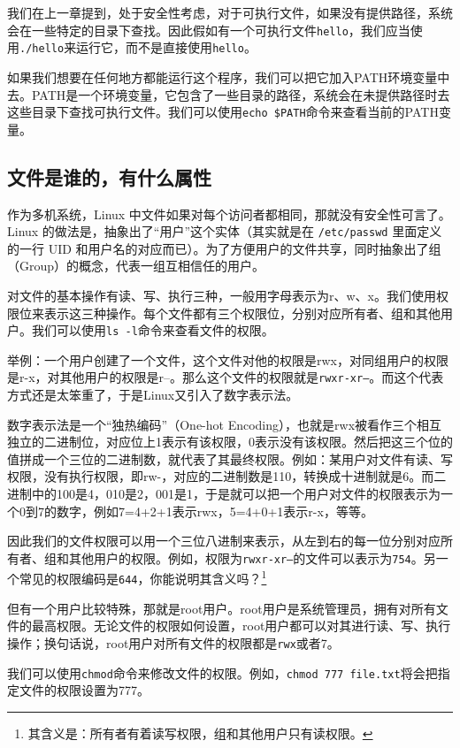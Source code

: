 我们在上一章提到，处于安全性考虑，对于可执行文件，如果没有提供路径，系统会在一些特定的目录下查找。因此假如有一个可执行文件\texttt{hello}，我们应当使用\texttt{./hello}来运行它，而不是直接使用\texttt{hello}。

如果我们想要在任何地方都能运行这个程序，我们可以把它加入PATH环境变量中去。PATH是一个环境变量，它包含了一些目录的路径，系统会在未提供路径时去这些目录下查找可执行文件。我们可以使用\texttt{echo \$PATH}命令来查看当前的PATH变量。

\subsection{文件是谁的，有什么属性}

作为多机系统，Linux 中文件如果对每个访问者都相同，那就没有安全性可言了。Linux 的做法是，抽象出了“用户”这个实体（其实就是在 \texttt{/etc/passwd} 里面定义的一行 UID 和用户名的对应而已）。为了方便用户的文件共享，同时抽象出了组（Group）的概念，代表一组互相信任的用户。

对文件的基本操作有读、写、执行三种，一般用字母表示为r、w、x。我们使用权限位来表示这三种操作。每个文件都有三个权限位，分别对应所有者、组和其他用户。我们可以使用\texttt{ls -l}命令来查看文件的权限。

举例：一个用户创建了一个文件，这个文件对他的权限是rwx，对同组用户的权限是r-x，对其他用户的权限是r--。那么这个文件的权限就是\texttt{rwxr-xr--}。而这个代表方式还是太笨重了，于是Linux又引入了数字表示法。

数字表示法是一个“独热编码”（One-hot Encoding），也就是rwx被看作三个相互独立的二进制位，对应位上1表示有该权限，0表示没有该权限。然后把这三个位的值拼成一个三位的二进制数，就代表了其最终权限。例如：某用户对文件有读、写权限，没有执行权限，即rw-，对应的二进制数是110，转换成十进制就是6。而二进制中的100是4，010是2，001是1，于是就可以把一个用户对文件的权限表示为一个0到7的数字，例如7=4+2+1表示rwx，5=4+0+1表示r-x，等等。

因此我们的文件权限可以用一个三位八进制来表示，从左到右的每一位分别对应所有者、组和其他用户的权限。例如，权限为\texttt{rwxr-xr--}的文件可以表示为\texttt{754}。另一个常见的权限编码是\texttt{644}，你能说明其含义吗？\footnote{其含义是：所有者有着读写权限，组和其他用户只有读权限。}

但有一个用户比较特殊，那就是root用户。root用户是系统管理员，拥有对所有文件的最高权限。无论文件的权限如何设置，root用户都可以对其进行读、写、执行操作；换句话说，root用户对所有文件的权限都是\texttt{rwx}或者7。

我们可以使用\texttt{chmod}命令来修改文件的权限。例如，\texttt{chmod 777 file.txt}将会把指定文件的权限设置为777。


